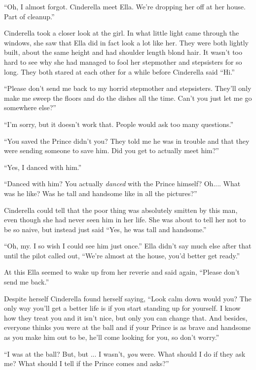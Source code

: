 \documentclass[11pt,letterpaper]{article}
\begin{document}
``Oh, I almost forgot. Cinderella meet Ella. We're dropping her off at her house. Part of cleanup.''

Cinderella took a closer look at the girl. In what little light came through the windows, she saw that Ella did in fact look a lot like her. They were both lightly built, about the same height and had shoulder length blond hair. It wasn't too hard to see why she had managed to fool her stepmother and stepsisters for so long. They both stared at each other for a while before Cinderella said ``Hi.''

``Please don't send me back to my horrid stepmother and stepsisters. They'll only make me sweep the floors and do the dishes all the time. Can't you just let me go somewhere else?''

``I'm sorry, but it doesn't work that. People would ask too many questions.''

``You saved the Prince didn't you? They told me he was in trouble and that they were sending someone to save him. Did you get to actually meet him?''

``Yes, I danced with him.''

``Danced with him? You actually \textit{danced} with the Prince himself? Oh.... What was he like? Was he tall and handsome like in all the pictures?''

Cinderella could tell that the poor thing was absolutely smitten by this man, even though she had never seen him in her life. She was about to tell her not to be so naive, but instead just said ``Yes, he was tall and handsome.''

``Oh, my. I so wish I could see him just once.'' Ella didn't say much else after that until the pilot called out, ``We're almost at the house, you'd better get ready.''

At this Ella seemed to wake up from her reverie and said again, ``Please don't send me back.''

Despite herself Cinderella found herself saying, ``Look calm down would you? The only way you'll get a better life is if you start standing up for yourself. I know how they treat you and it isn't nice, but only you can change that.  And besides, everyone thinks you were at the ball and if your Prince is as brave and handsome as you make him out to be, he'll come looking for you, so don't worry.''

``I was at the ball? But, but ... I wasn't, \textit{you} were. What should I do if they ask me? What should I tell if the Prince comes and asks?''
\end{document}
